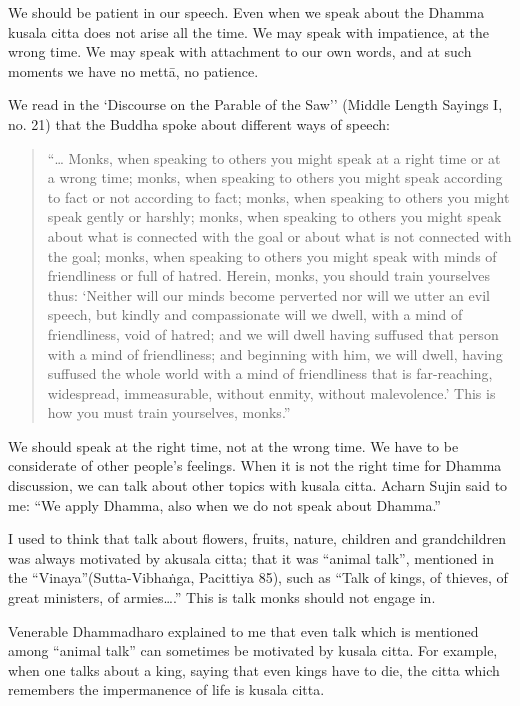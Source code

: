 We should be patient in our speech. Even when we speak about the Dhamma
kusala citta does not arise all the time. We may speak with impatience,
at the wrong time. We may speak with attachment to our own words, and at
such moments we have no mettā, no patience.

We read in the `Discourse on the Parable of the Saw'' (Middle Length
Sayings I, no. 21) that the Buddha spoke about different ways of speech:

\begin{quote}

``\ldots{} Monks, when speaking to others you might speak at a right
time or at a wrong time; monks, when speaking to others you might speak
according to fact or not according to fact; monks, when speaking to
others you might speak gently or harshly; monks, when speaking to others
you might speak about what is connected with the goal or about what is
not connected with the goal; monks, when speaking to others you might
speak with minds of friendliness or full of hatred. Herein, monks, you
should train yourselves thus: `Neither will our minds become perverted
nor will we utter an evil speech, but kindly and compassionate will we
dwell, with a mind of friendliness, void of hatred; and we will dwell
having suffused that person with a mind of friendliness; and beginning
with him, we will dwell, having suffused the whole world with a mind of
friendliness that is far-reaching, widespread, immeasurable, without
enmity, without malevolence.' This is how you must train yourselves,
monks.''
\end{quote}

We should speak at the right time, not at the wrong time. We have to be
considerate of other people's feelings. When it is not the right time
for Dhamma discussion, we can talk about other topics with kusala citta.
Acharn Sujin said to me: ``We apply Dhamma, also when we do not speak
about Dhamma.''

I used to think that talk about flowers, fruits, nature, children and
grandchildren was always motivated by akusala citta; that it was
``animal talk'', mentioned in the ``Vinaya''(Sutta-Vibhaṅga, Pacittiya
85), such as ``Talk of kings, of thieves, of great ministers, of
armies\ldots{}.'' This is talk monks should not engage in.

Venerable Dhammadharo explained to me that even talk which is mentioned
among ``animal talk'' can sometimes be motivated by kusala citta. For
example, when one talks about a king, saying that even kings have to
die, the citta which remembers the impermanence of life is kusala citta.

